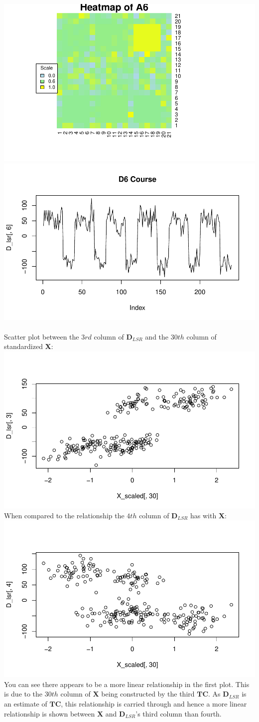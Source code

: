 \documentclass[11pt]{article}
\begin{document}
\includegraphics[width=.45\linewidth]{plots/A6_heatmap.pdf}
\includegraphics[width=.45\linewidth]{plots/D6_line.pdf}\\\\
Scatter plot between the $3rd$ column of $\textbf{D}_{LSR}$ and the $30th$ column of standardized \textbf{X}:\\
\includegraphics[width=.65\linewidth]{plots/d3_X_scatter.pdf}\\
When compared to the relationship the $4th$ column of $\textbf{D}_{LSR}$ has with \textbf{X}:\\
\includegraphics[width=.65\linewidth]{plots/scatter_d4_x.pdf}\\
You can see there appears to be a more linear relationship in the first plot. This is due to the $30th$ column of \textbf{X} being constructed by the third $\textbf{TC}$. As $\textbf{D}_{LSR}$ is an estimate of $\textbf{TC}$, this relationship is carried through and hence a more linear relationship is shown between \textbf{X} and $\textbf{D}_{LSR}$'s third column than fourth.\\\\
\end{document}
